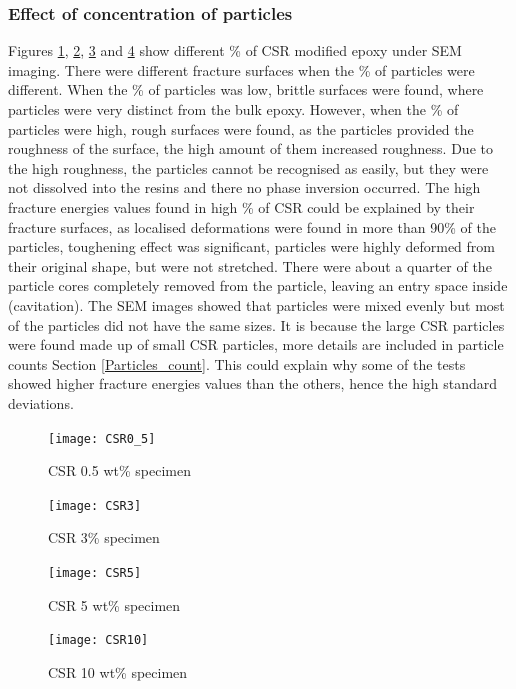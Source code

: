 \documentclass[numbers=noendperiod,chapterprefix=on]{icldt} %
\begin{document}
{\subsubsection{Effect of concentration of particles}
Figures \ref{CSR0_5}, \ref{CSR3}, \ref{CSR5} and \ref{CSR10} show different \% of CSR modified epoxy under SEM imaging. There were different fracture surfaces when the \% of particles were different. When the \% of particles was low, brittle surfaces were found, where particles were very distinct from the bulk epoxy. However, when the \% of particles were high, rough surfaces were found, as the particles provided the roughness of the surface, the high amount of them increased roughness. Due to the high roughness, the particles cannot be recognised as easily, but they were not dissolved into the resins and there no phase inversion occurred. The high fracture energies values found in high \% of CSR could be explained by their fracture surfaces, as localised deformations were found in more than 90\% of the particles, toughening effect was significant, particles were highly deformed from their original shape, but were not stretched. There were about a quarter of the particle cores completely removed from the particle, leaving an entry space inside (cavitation). The SEM images showed that particles were mixed evenly but most of the particles did not have the same sizes.
It is because the large CSR particles were found made up of small CSR particles, more details are included in particle counts Section \ref{Particles_count}. 
This could explain why some of the tests showed higher fracture energies values than the others, hence the high standard deviations. 

\begin{figure}[!hp]
\centering
\texttt{[image: CSR0\_5]}
\caption{CSR 0.5 wt\% specimen}\label{CSR0_5}
\end{figure}
\FloatBarrier

\begin{figure}[!htpb]
\centering
\texttt{[image: CSR3]}
\caption{CSR 3\% specimen}\label{CSR3}
\end{figure}
\FloatBarrier

\begin{figure}[!htpb]
\centering
\texttt{[image: CSR5]} 
\caption{CSR 5 wt\% specimen}\label{CSR5}
\end{figure}
\FloatBarrier

\begin{figure}[!htpb]
\centering
\texttt{[image: CSR10]}
\caption{CSR 10 wt\% specimen} \label{CSR10}
\end{figure}
\FloatBarrier

}
\end{document}
